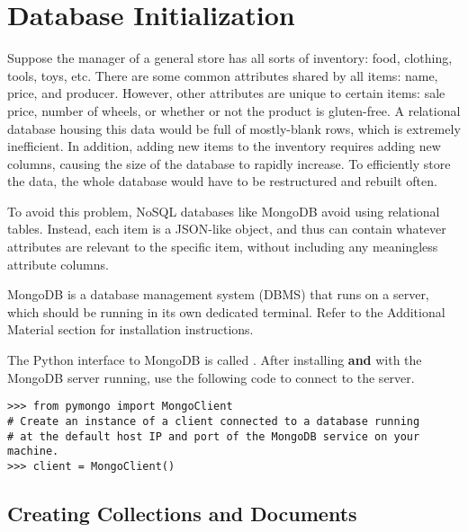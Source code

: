 \section*{Database Initialization} %

Suppose the manager of a general store has all sorts of inventory: food, clothing, tools, toys, etc.
There are some common attributes shared by all items: name, price, and producer.
However, other attributes are unique to certain items: sale price, number of wheels, or whether or not the product is gluten-free.
A relational database housing this data would be full of mostly-blank rows, which is extremely inefficient.
In addition, adding new items to the inventory requires adding new columns, causing the size of the database to rapidly increase.
To efficiently store the data, the whole database would have to be restructured and rebuilt often.

To avoid this problem, NoSQL databases like MongoDB avoid using relational tables.
Instead, each item is a JSON-like object, and thus can contain whatever attributes are relevant to the specific item, without including any meaningless attribute columns.

\begin{info}
MongoDB is a database management system (DBMS) that runs on a server, which should be running in its own dedicated terminal.
Refer to the Additional Material section for installation instructions.
\end{info}


The Python interface to MongoDB is called .
After installing  \textbf{and} with the MongoDB server running, use the following code to connect to the server.

\begin{lstlisting}
>>> from pymongo import MongoClient
# Create an instance of a client connected to a database running
# at the default host IP and port of the MongoDB service on your machine.
>>> client = MongoClient()
\end{lstlisting}

\subsection*{Creating Collections and Documents}

